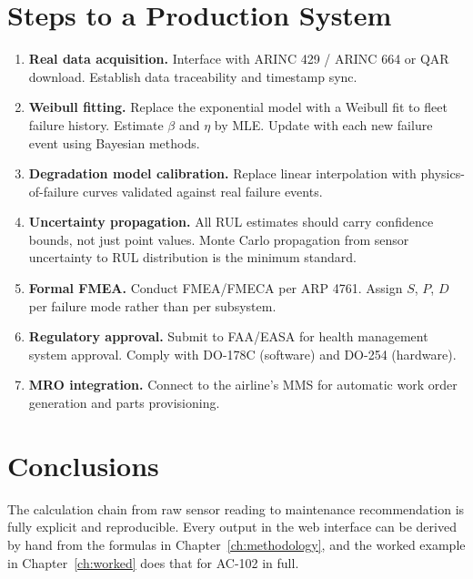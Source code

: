 \documentclass[11pt, a4paper]{report}
\begin{document}
\chapter{Steps to a Production System}
\label{ch:production}

\begin{enumerate}
  \item \textbf{Real data acquisition.} Interface with ARINC 429 / ARINC 664
        or QAR download. Establish data traceability and timestamp sync.

  \item \textbf{Weibull fitting.} Replace the exponential model with a Weibull
        fit to fleet failure history. Estimate $\beta$ and $\eta$ by MLE.
        Update with each new failure event using Bayesian methods.

  \item \textbf{Degradation model calibration.} Replace linear interpolation
        with physics-of-failure curves validated against real failure events.

  \item \textbf{Uncertainty propagation.} All RUL estimates should carry
        confidence bounds, not just point values. Monte Carlo propagation from
        sensor uncertainty to RUL distribution is the minimum standard.

  \item \textbf{Formal FMEA.} Conduct FMEA/FMECA per ARP 4761. Assign $S$,
        $P$, $D$ per failure mode rather than per subsystem.

  \item \textbf{Regulatory approval.} Submit to FAA/EASA for health management
        system approval. Comply with DO-178C (software) and DO-254 (hardware).

  \item \textbf{MRO integration.} Connect to the airline's MMS for automatic
        work order generation and parts provisioning.
\end{enumerate}

\chapter{Conclusions}

The calculation chain from raw sensor reading to maintenance recommendation is
fully explicit and reproducible. Every output in the web interface can be
derived by hand from the formulas in Chapter~\ref{ch:methodology}, and the
worked example in Chapter~\ref{ch:worked} does that for AC-102 in full.
\end{document}
